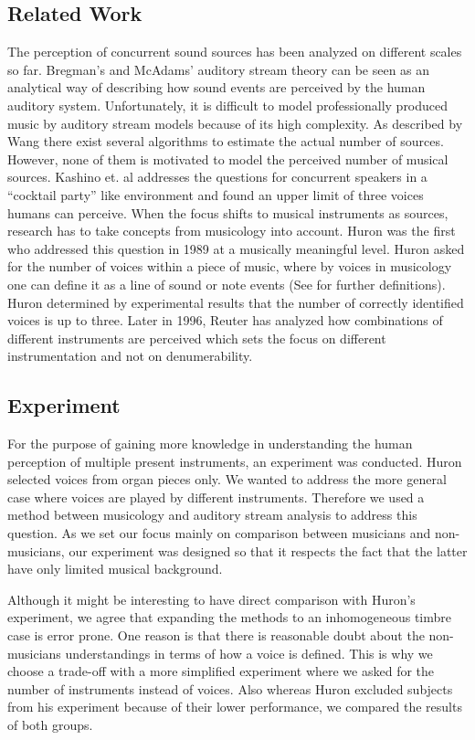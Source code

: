 \subsection{Related Work}
The perception of concurrent sound sources has been analyzed on different scales so far. Bregman's and McAdams' \cite{mcadams79} auditory stream theory can be seen as an analytical way of describing how sound events are perceived by the human auditory system. Unfortunately, it is difficult to model professionally produced music by auditory stream models because of its high complexity. As described by Wang \cite{wang2006} there exist several algorithms to estimate the actual number of sources. However, none of them is motivated to model the perceived number of musical sources. Kashino et. al \cite{kashino1995} addresses the questions for concurrent speakers in a ``cocktail party'' like environment and found an upper limit of three voices humans can perceive. When the focus shifts to musical instruments as sources, research has to take concepts from musicology into account. Huron \cite{huron89} was the first who addressed this question in 1989 at a musically meaningful level. Huron asked for the number of voices within a piece of music, where by voices in musicology one can define it as a line of sound or note events (See \cite{cambouropoulos2008voice} for further definitions). Huron determined by experimental results that the number of correctly identified voices is up to three. Later in 1996, Reuter \cite{reuter96} has analyzed how combinations of different instruments are perceived which sets the focus on different instrumentation and not on denumerability.

\subsection{Experiment}
For the purpose of gaining more knowledge in understanding the human perception of multiple present instruments, an experiment was conducted. Huron selected voices from organ pieces only. We wanted to address the more general case where voices are played by different instruments. Therefore we used a method between musicology and auditory stream analysis to address this question. As we set our focus mainly on comparison between musicians and non-musicians, our experiment was designed so that it respects the fact that the latter have only limited musical background.

Although it might be interesting to have direct comparison with Huron's experiment, we agree that expanding the methods to an inhomogeneous timbre case is error prone. One reason is that there is reasonable doubt about the non-musicians understandings in terms of how a voice is defined. This is why we choose a trade-off with a more simplified experiment where we asked for the number of instruments instead of voices. Also whereas Huron \cite{huron89}  excluded subjects from his experiment because of their lower performance, we compared the results of both groups.

